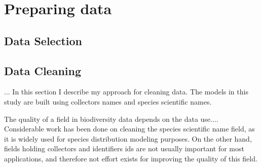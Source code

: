 \documentclass[a4paper]{article}
\begin{document}
\section{Preparing data}
\subsection{Data Selection}
\subsection{Data Cleaning}




...
In this section I describe my approach for cleaning data.
The models in this study are built using collectors names and species scientific names.

The quality of a field in biodiversity data depends on the data use.... \cite{KochVeiga2017}
Considerable work has been done on cleaning the species scientific name field, as it is widely used for species distribution modeling purposes.
On the other hand, fields holding collectors and identifiers ids are not usually important for most applications, and therefore not effort exists for improving the quality of this field.
\end{document}
